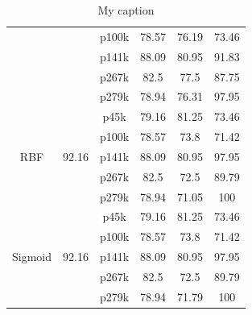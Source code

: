 \begin{table}[h]
{\begin{tabular}{cccccc}
                            &                                                 & p100k                    & 78.57            & 76.19         & 73.46                      \\
                            &                                                 & p141k                    & 88.09            & 80.95         & 91.83                      \\
                            &                                                 & p267k                    & 82.5             & 77.5          & 87.75                      \\
                            &                                                 & p279k                    & 78.94            & 76.31         & 97.95                      \\
\hline
\multirow{5}{*}{RBF}        & \multirow{5}{*}{92.16}                          & p45k                     & 79.16            & 81.25         & 73.46                      \\
                            &                                                 & p100k                    & 78.57            & 73.8          & 71.42                      \\
                            &                                                 & p141k                    & 88.09            & 80.95         & 97.95                      \\
                            &                                                 & p267k                    & 82.5             & 72.5          & 89.79                      \\
                            &                                                 & p279k                    & 78.94            & 71.05         & 100                        \\
\hline
\multirow{5}{*}{Sigmoid}    & \multirow{5}{*}{92.16}                          & p45k                     & 79.16            & 81.25         & 73.46                      \\
                            &                                                 & p100k                    & 78.57            & 73.8          & 71.42                      \\
                            &                                                 & p141k                    & 88.09            & 80.95         & 97.95                      \\
                            &                                                 & p267k                    & 82.5             & 72.5          & 89.79                      \\
                            &                                                 & p279k                    & 78.94            & 71.79         & 100                       \\
\hline
\end{tabular}
}
\caption{My caption}
\label{my-label}
\end{table}



